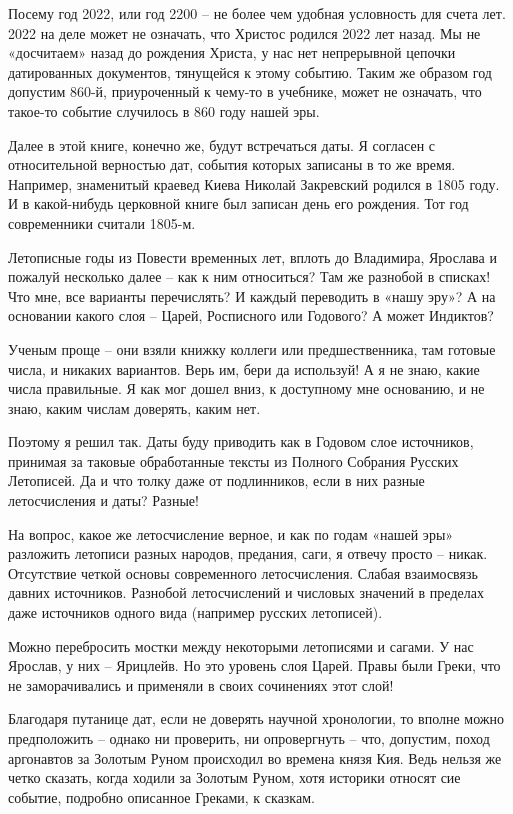 Посему год 2022, или год 2200 – не более чем удобная условность для счета лет. 2022 на деле может не означать, что Христос родился 2022 лет назад. Мы не «досчитаем» назад до рождения Христа, у нас нет непрерывной цепочки датированных документов, тянущейся к этому событию. Таким же образом год допустим 860-й, приуроченный к чему-то в учебнике, может не означать, что такое-то событие случилось в 860 году нашей эры.

Далее в этой книге, конечно же, будут встречаться даты. Я согласен с относительной верностью дат, события которых записаны в то же время. Например, знаменитый краевед Киева Николай Закревский родился в 1805 году. И в какой-нибудь церковной книге был записан день его рождения. Тот год современники считали 1805-м.

Летописные годы из Повести временных лет, вплоть до Владимира, Ярослава и пожалуй несколько далее – как к ним относиться? Там же разнобой в списках! Что мне, все варианты перечислять? И каждый переводить в «нашу эру»? А на основании какого слоя – Царей, Росписного или Годового? А может Индиктов?

Ученым проще – они взяли книжку коллеги или предшественника, там готовые числа, и никаких вариантов. Верь им, бери да используй! А я не знаю, какие числа правильные. Я как мог дошел вниз, к доступному мне основанию, и не знаю, каким числам доверять, каким нет.

Поэтому я решил так. Даты буду приводить как в Годовом слое источников, принимая за таковые обработанные тексты из Полного Собрания Русских Летописей. Да и что толку даже от подлинников, если в них разные летосчисления и даты? Разные!

На вопрос, какое же летосчисление верное, и как по годам «нашей эры» разложить летописи разных народов, предания, саги, я отвечу просто – никак. Отсутствие четкой основы современного летосчисления. Слабая взаимосвязь давних источников. Разнобой летосчислений и числовых значений в пределах даже источников одного вида (например русских летописей).

Можно перебросить мостки между некоторыми летописями и сагами. У нас Ярослав, у них – Ярицлейв. Но это уровень слоя Царей. Правы были Греки, что не заморачивались и применяли в своих сочинениях этот слой!

Благодаря путанице дат, если не доверять научной хронологии, то вполне можно предположить – однако ни проверить, ни опровергнуть – что, допустим, поход аргонавтов за Золотым Руном происходил во времена князя Кия. Ведь нельзя же четко сказать, когда ходили за Золотым Руном, хотя историки относят сие событие, подробно описанное Греками, к сказкам.

